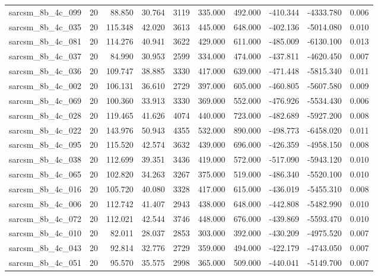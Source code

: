 \begin{tabular}{lrrrrrrrrr}
sarcsm\_8b\_4c\_099 & 20 & 88.850 & 30.764 & 3119 & 335.000 & 492.000 & -410.344 & -4333.780 & 0.006 \\
sarcsm\_8b\_4c\_035 & 20 & 115.348 & 42.020 & 3613 & 445.000 & 648.000 & -402.136 & -5014.080 & 0.010 \\
sarcsm\_8b\_4c\_081 & 20 & 114.276 & 40.941 & 3622 & 429.000 & 611.000 & -485.009 & -6130.100 & 0.013 \\
sarcsm\_8b\_4c\_037 & 20 & 84.990 & 30.953 & 2599 & 334.000 & 474.000 & -437.811 & -4620.450 & 0.007 \\
sarcsm\_8b\_4c\_036 & 20 & 109.747 & 38.885 & 3330 & 417.000 & 639.000 & -471.448 & -5815.340 & 0.011 \\
sarcsm\_8b\_4c\_002 & 20 & 106.131 & 36.610 & 2729 & 397.000 & 605.000 & -460.805 & -5607.580 & 0.009 \\
sarcsm\_8b\_4c\_069 & 20 & 100.360 & 33.913 & 3330 & 369.000 & 552.000 & -476.926 & -5534.430 & 0.006 \\
sarcsm\_8b\_4c\_028 & 20 & 119.465 & 41.626 & 4074 & 440.000 & 723.000 & -482.689 & -5927.200 & 0.008 \\
sarcsm\_8b\_4c\_022 & 20 & 143.976 & 50.943 & 4355 & 532.000 & 890.000 & -498.773 & -6458.020 & 0.011 \\
sarcsm\_8b\_4c\_095 & 20 & 115.520 & 42.574 & 3632 & 439.000 & 696.000 & -426.359 & -4958.150 & 0.008 \\
sarcsm\_8b\_4c\_038 & 20 & 112.699 & 39.351 & 3436 & 419.000 & 572.000 & -517.090 & -5943.120 & 0.010 \\
sarcsm\_8b\_4c\_065 & 20 & 102.820 & 34.263 & 3267 & 375.000 & 519.000 & -486.340 & -5520.100 & 0.010 \\
sarcsm\_8b\_4c\_016 & 20 & 105.720 & 40.080 & 3328 & 417.000 & 615.000 & -436.019 & -5455.310 & 0.008 \\
sarcsm\_8b\_4c\_006 & 20 & 112.742 & 41.407 & 2943 & 438.000 & 648.000 & -442.808 & -5482.990 & 0.010 \\
sarcsm\_8b\_4c\_072 & 20 & 112.021 & 42.544 & 3746 & 448.000 & 676.000 & -439.869 & -5593.470 & 0.010 \\
sarcsm\_8b\_4c\_010 & 20 & 82.011 & 28.037 & 2853 & 303.000 & 392.000 & -430.209 & -4975.520 & 0.007 \\
sarcsm\_8b\_4c\_043 & 20 & 92.814 & 32.776 & 2729 & 359.000 & 494.000 & -422.179 & -4743.050 & 0.007 \\
sarcsm\_8b\_4c\_051 & 20 & 95.570 & 35.575 & 2998 & 365.000 & 509.000 & -440.041 & -5149.700 & 0.007 \\

\end{tabular}
